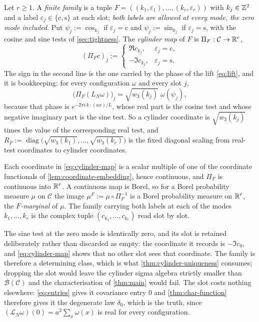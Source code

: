 \begin{definition}\label{def:cylinder-map}
Let $r\ge1$. A \emph{finite family} is a tuple
$F=((k_1,\varepsilon_1),\dots,(k_r,\varepsilon_r))$ with $k_j\in\mathbb{Z}^2$ and a
label $\varepsilon_j\in\{\mathrm c,\mathrm s\}$ at each slot; \emph{both labels
are allowed at every mode, the zero mode included}. Put $\psi_j:=\cos_{k_j}$ if
$\varepsilon_j=\mathrm c$ and $\psi_j:=\sin_{k_j}$ if
$\varepsilon_j=\mathrm s$, with the cosine and sine tests of
\cref{sec:tightness}. The \emph{cylinder map} of $F$ is
$\Pi_F:\mathcal C\to\mathbb{R}^r$,
\begin{equation}\label{eq:cylinder-map}
  (\Pi_Fc)_j:=
  \begin{cases}
    \Re c_{k_j}, & \varepsilon_j=\mathrm c,\\[2pt]
    -\Im c_{k_j}, & \varepsilon_j=\mathrm s .
  \end{cases}
\end{equation}
The sign in the second line is the one carried by the phase of the lift
\eqref{eq:lift}, and it is bookkeeping: for every configuration $\omega$ and
every slot $j$,
\begin{equation}\label{eq:cylinder-lift}
  \bigl(\Pi_F(L_N\omega)\bigr)_j=\sqrt{w_3(k_j)}\;\omega(\psi_j),
\end{equation}
because that phase is $e^{-2\pi i\,k\cdot(ax)/L}$, whose real part is the
cosine test and whose negative imaginary part is the sine test. So a cylinder
coordinate is $\sqrt{w_3(k_j)}$ times the value of the corresponding real
test, and $R_F:=\operatorname{diag}\bigl(\sqrt{w_3(k_1)},\dots,
\sqrt{w_3(k_r)}\bigr)$ is the fixed diagonal scaling from real-test
coordinates to cylinder coordinates.

Each coordinate in \eqref{eq:cylinder-map} is a scalar multiple of one of the
coordinate functionals of \cref{lem:coordinate-embedding}, hence continuous,
and $\Pi_F$ is continuous into $\mathbb{R}^r$. A continuous map is Borel, so for a
Borel probability measure $\mu$ on $\mathcal C$ the image
$\mu^F:=\mu\circ\Pi_F^{-1}$ is a Borel probability measure on $\mathbb{R}^r$, the
\emph{$F$-marginal} of $\mu$. The family carrying both labels at each of the
modes $k_1,\dots,k_r$ is the complex tuple $(c_{k_1},\dots,c_{k_r})$ read slot
by slot.

The sine test at the zero mode is identically zero, and its slot is retained
deliberately rather than discarded as empty: the coordinate it records is
$-\Im c_0$, and
\eqref{eq:cylinder-map} shows that no other slot sees that coordinate. The
family is therefore a determining class, which is what
\cref{thm:cylinder-uniqueness} consumes; dropping the slot would leave the
cylinder sigma algebra strictly smaller than $\mathcal B(\mathcal C)$ and the
characterisation of \cref{thm:main} would fail. The slot costs nothing
elsewhere: \eqref{eq:entries} gives it covariance entry $0$ and
\cref{thm:char-function} therefore gives it the degenerate law $\delta_0$,
which is the truth, since $(\mathcal L_N\omega)(0)=a^{2}\sum_{x}\omega(x)$ is
real for every configuration.
\end{definition}

